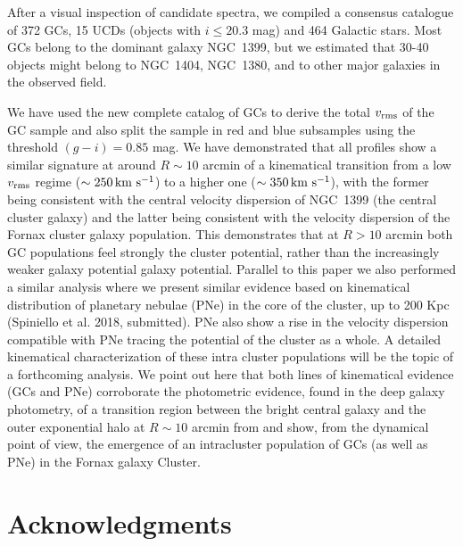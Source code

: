 \documentclass[usenatbib]{mnras}
\newcommand{\kms}{\mbox{\,km~s$^{-1}$}}
\begin{document}
After a visual inspection of candidate spectra, we compiled a consensus
catalogue of 372 GCs, 15 UCDs (objects with $i \le 20.3$ mag) and 464 Galactic
stars. Most GCs belong to the dominant galaxy NGC~1399, but we estimated that
30-40 objects might belong to NGC~1404, NGC~1380, and to other major galaxies
in the observed field.

We have used the new complete catalog of GCs to derive the total  $v_{\rm rms}$
of the GC sample and also split the sample in red and blue subsamples using
the threshold $(g - i) = 0.85$ mag.
We have demonstrated that all profiles show a similar signature at around
$R\sim10$ arcmin of a kinematical transition from a low $v_{\rm rms}$ regime ($\sim 250 \kms$) to a
higher one ($\sim 350 \kms$), with the former being consistent with the central velocity
dispersion of NGC~1399 (the central cluster galaxy) and the latter being
consistent with the velocity dispersion of the Fornax cluster galaxy population. This
demonstrates that at $R>10$ arcmin both GC populations feel strongly the cluster
potential, rather than the increasingly weaker galaxy potential galaxy potential. Parallel to this paper
we also performed a similar analysis where we present similar evidence based on
kinematical distribution of planetary nebulae (PNe) in the core of the cluster,
up to 200 Kpc (Spiniello et al. 2018, submitted). PNe also show a rise in the
velocity dispersion compatible with PNe tracing the potential of the cluster as
a whole. A detailed kinematical characterization of these intra cluster populations will
be the topic of a forthcoming analysis. We point out here that both lines of kinematical
evidence (GCs and PNe) corroborate the photometric evidence, found in the deep
galaxy photometry, of a transition region between the bright central galaxy and
the outer exponential halo at $R\sim10$ arcmin from \citet{Iodice16} and
show, from the dynamical point of view, the emergence of an intracluster
population of GCs (as well as PNe) in the Fornax galaxy Cluster.

\section*{Acknowledgments}
\end{document}
